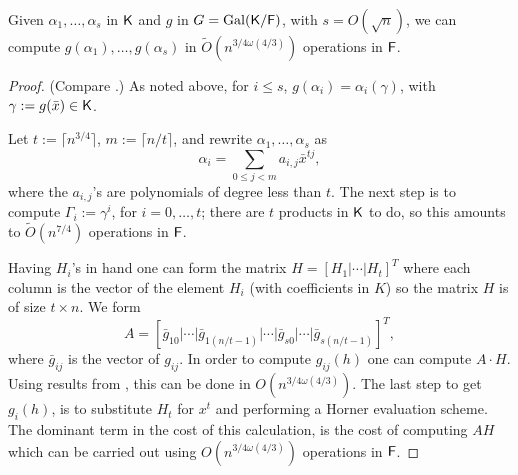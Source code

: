 \begin{lemma}\label{lem:modcom}
  Given $\alpha_1,\dots,\alpha_s$ in ${\mathsf{K}}$ and $g$ in $G =
  \mathrm{Gal}({\mathsf{K}}/{\mathsf{F}})$, with $s = O(\sqrt{n})$, we can compute
  $g(\alpha_1),\dots,g(\alpha_s)$ in $\tilde
  O(n^{{3}/{4}\omega({4}/{3})})$ operations in ${\mathsf{F}}$.
\end{lemma}
\begin{proof}
(Compare \cite[Lemma~3]{Kaltofen}.) As noted above, for $i\le s$,
  $g(\alpha_i) = \alpha_i(\gamma)$, with $\gamma := g(\bar x) \in {\mathsf{K}}$.

  Let $t := \lceil n^{3/4} \rceil$, $m:=\lceil n/t\rceil$, and rewrite $\alpha_1 , \ldots , \alpha_s$ as 
$$\alpha_i = \sum_{0 \leq j < m} a_{i,j}\bar x^{tj},$$ where the
  $a_{i,j}$'s are polynomials of degree less than $t$. The next step
  is to compute $\Gamma_i := \gamma^i$, for $i = 0 , \ldots , t$;
  there are $t$ products in ${\mathsf{K}}$ to do, so this amounts to
  $\tilde{O}(n^{7/4})$ operations in ${\mathsf{F}}$.

  Having $H_i$'s in hand one can form the matrix $H = \left[ H_1 \vert
    \cdots \vert H_t \right]^T$ where each column is the vector of the
  element $H_i$ (with coefficients in $K$) so the matrix $H$ is of
  size $t \times n$. We form
$$A = \left[\bar{g}_{10}\vert \cdots \vert \bar{g}_{1(n/t-1)}\vert
  \cdots \vert \bar{g}_{s0}\vert \cdots \vert
  \bar{g}_{s(n/t-1)}\right]^T,$$ where $\bar{g}_{ij}$ is the vector of
$g_{ij}$. In order to compute $g_{ij}(h)$ one can compute $A \cdot
H$. Using results from \cite{LeGall}, this can be done in $O(n^{3/4
  \omega(4/3)})$. The last step to get $g_i(h)$, is to substitute
$H_t$ for $x^t$ and performing a Horner evaluation scheme. The
dominant term in the cost of this calculation, is the cost of
computing $AH$ which can be carried out using $O(n^{3/4 \omega(4/3)})$
operations in ${\mathsf{F}}$.
\end{proof}

